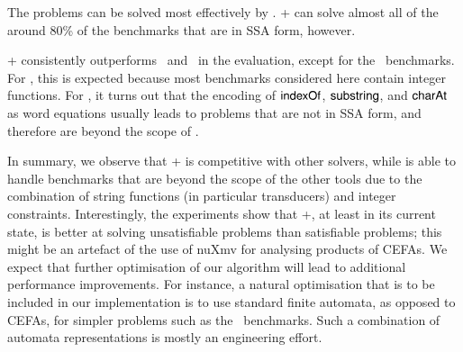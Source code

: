 %
%

The {\kaluzabench} problems can be solved most effectively by {\cvc}. \ostrich+ can solve almost all of the around 80\% of the benchmarks
that are in SSA form, however.
%

\ostrich+ consistently outperforms \ostrichi\ and \ostrichii\ in the
evaluation, except for the \kaluzabench\ benchmarks. For
\ostrichi, this is expected because most benchmarks considered
here contain integer functions. For \ostrichii, it turns out that the
encoding of $\mathsf{indexOf}$, $\mathsf{substring}$, and $\mathsf{charAt}$ as word equations
usually leads to problems that are not in SSA form, and therefore are
beyond the scope of \ostrich.


In summary, we  observe that \ostrich+ is competitive with other solvers, while is able to handle benchmarks that are beyond
the scope of the other tools due to the combination of string functions (in particular transducers) and integer
constraints. Interestingly, the experiments show that \ostrich+, at
least in its current state, is better at solving unsatisfiable problems than satisfiable problems; this might be an artefact of the
use of nuXmv for analysing products of CEFAs. We expect that further
optimisation of our algorithm will lead to additional performance improvements. 
For instance, a natural optimisation that is to be
included in our implementation is to use standard finite automata, %
as opposed to CEFAs, for simpler problems such as the
\kaluzabench\ benchmarks. Such a combination of automata
representations is mostly an engineering effort.

